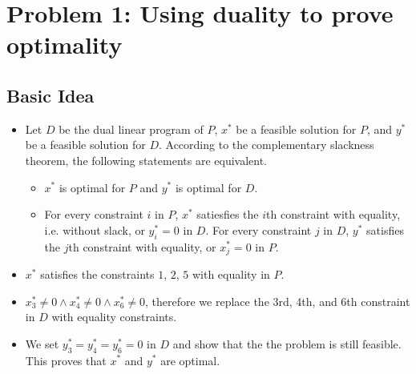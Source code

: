 \documentclass[12pt]{article}
\begin{document}
\section*{Problem 1: Using duality to prove optimality}
\subsection*{Basic Idea}
\begin{itemize}
	\item Let $D$ be the dual linear program of $P$, $x^*$ be a feasible solution for $P$, and $y^*$ be a feasible solution for $D$. According to the complementary slackness theorem, the following statements are equivalent.
	\begin{itemize}
		\item $x^*$ is optimal for $P$ and $y^*$ is optimal for $D$.
		\item For every constraint $i$ in $P$, $x^*$ satiesfies the $i$th constraint with equality, i.e. without slack, or $y_i^* = 0$ in $D$. For every constraint $j$ in $D$, $y^*$ satisfies the $j$th constraint with equality, or $x_j^* = 0$ in $P$.
	\end{itemize}
	\item $x^*$ satisfies the constraints $1$, $2$, $5$ with equality in $P$.
	\item $x_3^* \not= 0 \wedge x_4^* \not= 0 \wedge x_6^* \not= 0$, therefore we replace the 3rd, 4th, and 6th constraint in $D$ with equality constraints.
	\item We set $y_3^* = y_4^* = y_6^* = 0$ in $D$ and show that the the problem is still feasible. This proves that $x^*$ and $y^*$ are optimal.
\end{itemize}
\end{document}
